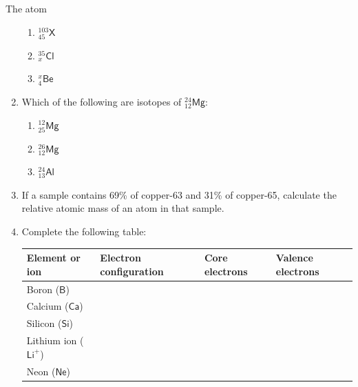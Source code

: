 \begin{eocexercises}{The atom}
\begin{enumerate}[noitemsep, label=\textbf{\arabic*}. ]
\begin{enumerate}[noitemsep, label=\textbf{\alph*}. ]
            \item $_{45}^{103}\mathsf{X}$
\item $_{x}^{35}\mathsf{Cl}$
\item $_{4}^{x}\mathsf{Be}$
\end{enumerate}
\item Which of the following are isotopes of $_{12}^{24}\mathsf{Mg}$: \label{m38741*id743234}
\begin{enumerate}[noitemsep, label=\textbf{\alph*}. ] 
            \item $_{25}^{12}\mathsf{Mg}$
\item $_{12}^{26}\mathsf{Mg}$
\item $_{13}^{24}\mathsf{Al}$
\end{enumerate}
\item If a sample contains 69\% of copper-63 and 31\% of copper-65, calculate the relative atomic mass of an atom in that sample.\newline
            \item Complete the following table:
          \begin{table}[H]
        \begin{center}
      \label{m38741*eip-282}
    \noindent
      \begin{tabular}{|l|l|l|l|}\hline
        Element or ion &
        Electron configuration &
        Core electrons &
        Valence electrons \\ \hline
        Boron ($\mathsf{B}$) &
         &
         &
       \\ \hline
        Calcium ($\mathsf{Ca}$) &
         &
         &
     \\ \hline
        Silicon ($\mathsf{Si}$) &
         &
         &
       \\ \hline
        Lithium ion ($\mathsf{Li}^{+}$) &
         &
         &
      \\ \hline
        Neon ($\mathsf{Ne}$) &
         &
         &
     \\ \hline
    \end{tabular}
      \end{center}
\end{table}
    \par
\end{enumerate}
  \label{m38741**end}
  \label{ea1c9e59656f96ee804546971cf6dee6**end}

\end{eocexercises}
